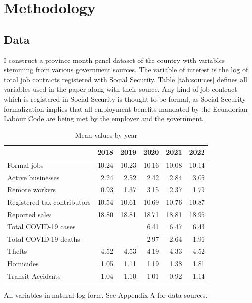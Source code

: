 \documentclass[11pt,a4paper]{article}\usepackage[]{graphicx}\usepackage[]{xcolor}
\begin{document}
\section{Methodology}
\subsection{Data}
I construct a province-month panel dataset of the country with variables stemming from various government sources. The variable of interest is the log of total job contracts registered with Social Security. Table \ref{tab:sources} defines all variables used in the paper along with their source. Any kind of job contract which is registered in Social Security is thought to be formal, as Social Security formalization implies that all employment benefits mandated by the Ecuadorian Labour Code are being met by the employer and the government.
\begin{table}[h]
\caption{Mean values by year}
\label{tab:descrip}
\centering

\begin{tabular}[t]{lrrrrr}
\toprule
  & 2018 & 2019 & 2020 & 2021 & 2022\\
\midrule
Formal jobs & \num{10.24} & \num{10.23} & \num{10.16} & \num{10.08} & \num{10.14}\\
Active businesses & \num{2.24} & \num{2.52} & \num{2.42} & \num{2.84} & \num{3.05}\\
Remote workers & \num{0.93} & \num{1.37} & \num{3.15} & \num{2.37} & \num{1.79}\\
Registered tax contributors & \num{10.54} & \num{10.61} & \num{10.69} & \num{10.76} & \num{10.87}\\
Reported sales & \num{18.80} & \num{18.81} & \num{18.71} & \num{18.81} & \num{18.96}\\
Total COVID-19 cases &  &  & \num{6.41} & \num{6.47} & \num{6.43}\\
Total COVID-19 deaths &  &  & \num{2.97} & \num{2.64} & \num{1.96}\\
Thefts & \num{4.52} & \num{4.53} & \num{4.19} & \num{4.33} & \num{4.52}\\
Homicides & \num{1.05} & \num{1.11} & \num{1.19} & \num{1.38} & \num{1.81}\\
Transit Accidents & \num{1.04} & \num{1.10} & \num{1.01} & \num{0.92} & \num{1.14}\\
\bottomrule
\end{tabular}


\vspace{0.3cm}
All variables in natural log form. See Appendix A for data sources.
\end{table}
\end{document}
